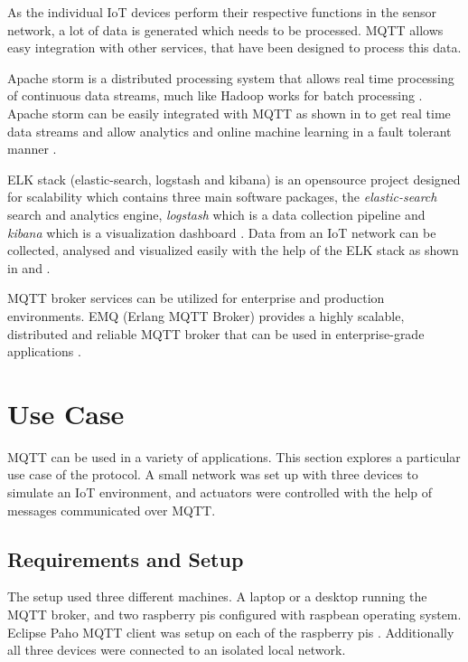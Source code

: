 \documentclass[sigconf]{acmart}
\begin{document}
As the individual IoT devices perform their respective functions in
the sensor network, a lot of data is generated which needs to be
processed. MQTT allows easy integration with other services, that have
been designed to process this data.

Apache storm is a distributed processing system that allows real time
processing of continuous data streams, much like Hadoop works for
batch processing \cite{apache-storm}. Apache storm can be easily
integrated with MQTT as shown in \cite{apache-storm-mqtt} to get real
time data streams and allow analytics and online machine learning in a
fault tolerant manner \citep{apache-storm-wiki}.

ELK stack (elastic-search, logstash and kibana) is an opensource
project designed for scalability which contains three main software
packages, the {\em elastic-search} search and analytics engine, {\em
  logstash} which is a data collection pipeline and {\em kibana} which
is a visualization dashboard \cite{elk-stack}. Data from an IoT
network can be collected, analysed and visualized easily with the help
of the ELK stack as shown in \cite{mqtt-elasticsearch-setup} and
\cite{kibana-mqtt-analysis}.

MQTT broker services can be utilized for enterprise and production
environments. EMQ (Erlang MQTT Broker) provides a highly scalable,
distributed and reliable MQTT broker that can be used in
enterprise-grade applications \cite{erlang-mqtt-broker}.


\section{Use Case}

MQTT can be used in a variety of applications. This section explores a
particular use case of the protocol. A small network was set up with
three devices to simulate an IoT environment, and actuators were
controlled with the help of messages communicated over MQTT.

\subsection{Requirements and Setup}

The setup used three different machines. A laptop or a desktop running
the MQTT broker, and two raspberry pis configured with raspbean
operating system. Eclipse Paho MQTT client was setup on each of the
raspberry pis \cite{python-paho-mqtt}. Additionally all three devices
were connected to an isolated local network.
\end{document}
